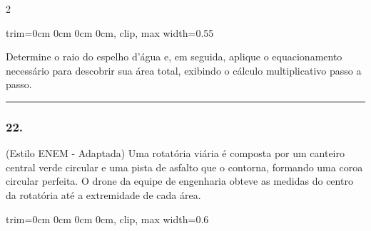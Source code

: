 \documentclass[twoside, 10pt, a4paper]{article}
\newlength{\espacoPreQuestao}\setlength{\espacoPreQuestao}{0.1cm}
\newlength{\espacoQuestao}\setlength{\espacoQuestao}{0.2cm}
\begin{document}
\begin{multicols*}{2}
\begin{center}
\begin{adjustbox}{trim=0cm 0cm 0cm 0cm, clip, max width=0.55\linewidth}
\end{adjustbox}
\end{center}

Determine o raio do espelho d'água e, em seguida, aplique o equacionamento necessário para descobrir sua área total, exibindo o cálculo multiplicativo passo a passo.
\par\vspace{\espacoQuestao}

\noindent\textcolor{CorLinha}{\rule{\linewidth}{0.5pt}} 
\par\vspace{\espacoPreQuestao}
\subsubsection*{22.} (Estilo ENEM - Adaptada) Uma rotatória viária é composta por um canteiro central verde circular e uma pista de asfalto que o contorna, formando uma coroa circular perfeita. O drone da equipe de engenharia obteve as medidas do centro da rotatória até a extremidade de cada área.

\begin{center}
\begin{adjustbox}{trim=0cm 0cm 0cm 0cm, clip, max width=0.6\linewidth}
\end{adjustbox}
\end{center}
\end{multicols*}
\end{document}
